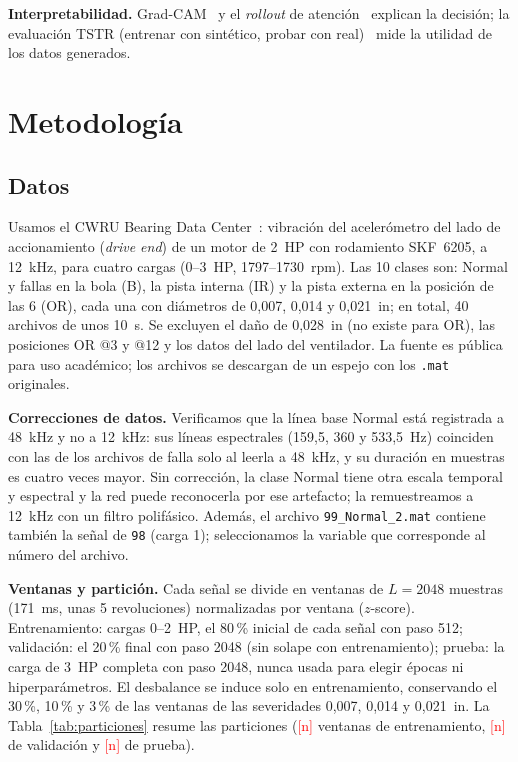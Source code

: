 \documentclass[conference]{IEEEtran}
\newcommand{\pend}[1]{\textcolor{red}{[#1]}}
\providecommand{\NTRAIN}{\pend{n}}\providecommand{\NSYN}{\pend{n}}
\providecommand{\NVAL}{\pend{n}}\providecommand{\NTEST}{\pend{n}}
\begin{document}
\textbf{Interpretabilidad.} Grad-CAM~\cite{selvaraju2017gradcam} y el \emph{rollout} de atención~\cite{abnar2020rollout} explican la decisión; la evaluación TSTR (entrenar con sintético, probar con real)~\cite{esteban2017rcgan} mide la utilidad de los datos generados.

\section{Metodología}
\subsection{Datos}
Usamos el CWRU Bearing Data Center~\cite{cwru}: vibración del acelerómetro del lado de accionamiento (\emph{drive end}) de un motor de 2~HP con rodamiento SKF~6205, a 12~kHz, para cuatro cargas (0--3~HP, 1797--1730~rpm). Las 10 clases son: Normal y fallas en la bola (B), la pista interna (IR) y la pista externa en la posición de las 6 (OR), cada una con diámetros de 0,007, 0,014 y 0,021~in; en total, 40 archivos de unos 10~s. Se excluyen el daño de 0,028~in (no existe para OR), las posiciones OR @3 y @12 y los datos del lado del ventilador. La fuente es pública para uso académico; los archivos se descargan de un espejo con los \texttt{.mat} originales.

\textbf{Correcciones de datos.} Verificamos que la línea base Normal está registrada a 48~kHz y no a 12~kHz: sus líneas espectrales (159,5, 360 y 533,5~Hz) coinciden con las de los archivos de falla solo al leerla a 48~kHz, y su duración en muestras es cuatro veces mayor. Sin corrección, la clase Normal tiene otra escala temporal y espectral y la red puede reconocerla por ese artefacto; la remuestreamos a 12~kHz con un filtro polifásico. Además, el archivo \texttt{99\_Normal\_2.mat} contiene también la señal de \texttt{98} (carga 1); seleccionamos la variable que corresponde al número del archivo.

\textbf{Ventanas y partición.} Cada señal se divide en ventanas de $L=2048$ muestras (171~ms, unas 5 revoluciones) normalizadas por ventana ($z$-score). Entrenamiento: cargas 0--2~HP, el 80\,\% inicial de cada señal con paso 512; validación: el 20\,\% final con paso 2048 (sin solape con entrenamiento); prueba: la carga de 3~HP completa con paso 2048, nunca usada para elegir épocas ni hiperparámetros. El desbalance se induce solo en entrenamiento, conservando el 30\,\%, 10\,\% y 3\,\% de las ventanas de las severidades 0,007, 0,014 y 0,021~in. La Tabla~\ref{tab:particiones} resume las particiones (\NTRAIN{} ventanas de entrenamiento, \NVAL{} de validación y \NTEST{} de prueba).
\end{document}
